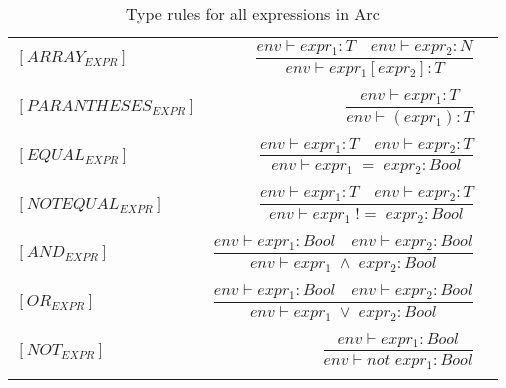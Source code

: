 \begin{table}
    \centering
    \begin{tabular}{lr>{\raggedright\arraybackslash}p{6cm}}
        $[ARRAY_{EXPR}]$       & $ \dfrac
            {env\vdash expr_1: T \quad env \vdash expr_2 : N}
            {env\vdash expr_1[expr_2] : T}$
        \\
        \\
        $[PARANTHESES_{EXPR}]$ & $ \dfrac
            {env\vdash expr_1: T}
            {env\vdash (expr_1) : T}$
        \\
        \\
        $[EQUAL_{EXPR}] $      & $\dfrac
            {env\vdash expr_1: T \quad env\vdash expr_2: T}
            {env\vdash expr_1 \;= \;expr_2: Bool}$
        \\
        \\
        $[NOTEQUAL_{EXPR}] $   & $\dfrac
            {env\vdash expr_1: T \quad env\vdash expr_2: T}
            {env\vdash expr_1 \;!= \;expr_2: Bool}$
        \\
        \\
        $[AND_{EXPR}] $        & $\dfrac
            {env\vdash expr_1: Bool \quad env\vdash expr_2: Bool}
            {env\vdash expr_1 \;\land \;expr_2: Bool}$
        \\
        \\
        $[OR_{EXPR}] $         & $\dfrac
            {env\vdash expr_1: Bool \quad env\vdash expr_2: Bool}
            {env\vdash expr_1 \;\lor \;expr_2: Bool}$
        \\
        \\
        $[NOT_{EXPR}] $        & $\dfrac
            {env\vdash expr_1: Bool}
            {env\vdash not \; expr_1 : Bool}$
        \\
        \\
    \end{tabular}
    \caption{Type rules for all expressions in Arc}
    \label{tab:expr-rules}
\end{table}

